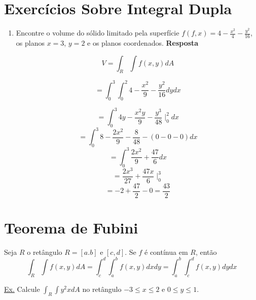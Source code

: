 \documentclass[portugues, 11pt]{article}
\begin{document}
	
	
  	\section{Exercícios Sobre Integral Dupla}
	
    	\begin{enumerate}
    		\item Encontre o volume do sólido limitado pela superfície $ f(f,x)=4 - \frac{x^2}{4} - \frac{y^2}{16}$, os planos $x=3$, $y=2$ e os planos coordenados.
    		\textbf{Resposta}
    		
    		\begin{equation}
    			V = \int_{R}\int{f(x,y) dA}
    		\end{equation}
    		
    		\begin{equation}
    			= \int_0^3\int_0^2{4-\frac{x^2}{9}-\frac{y^2}{16}} dy dx
    		\end{equation}
    		
    		\begin{equation}
    			= \int_0^3{4y-\frac{x^2y}{9}-\frac{y^3}{48}\mid_0^2}dx
    		\end{equation}
    		\begin{equation}
    			= \int_0^3{8-\frac{2x^2}{9}-\frac{8}{48}-(0-0-0)} dx
    		\end{equation}
    		\begin{equation}
    			= \int_0^3{\frac{2x^2}{9}+\frac{47}{6}}dx
    		\end{equation}
    		\begin{equation}
    			= \frac{2x^3}{27}+\frac{47x}{6}\mid_0^3
    		\end{equation}
    		\begin{equation}
    			= -2 + \frac{47}{2} - 0 = \frac{43}{2}
    		\end{equation}
    	\end{enumerate}
	
	\section{Teorema de Fubini}
	Seja $R$ o retângulo $R=[a.b]$ e $[c,d]$. Se $f$ é contínua em $R$, então
	\begin{equation}
		\int_R\int{f(x,y)} dA = \int_c^d\int_a^b{f(x,y)}dxdy 
		= \int_a^b\int_c^d{f(x,y)} dydx
	\end{equation}
	
	\underline{Ex.} Calcule $\int_R\int{y^2x}dA$ no retângulo $-3\leq x\leq 2$ e $0 \leq y \leq 1$.
	
\end{document}
